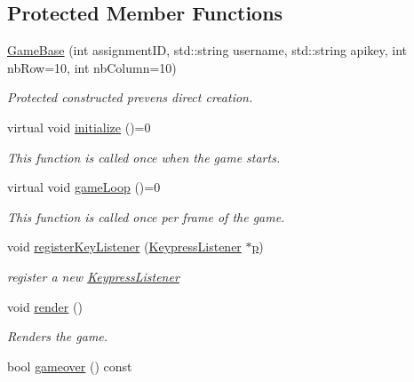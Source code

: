 \subsection*{Protected Member Functions}
\begin{DoxyCompactItemize}
\item 
\hyperlink{classbridges_1_1game_1_1_game_base_abd73825c57a10d28191a3f1162eb9bd8}{Game\+Base} (int assignment\+ID, std\+::string username, std\+::string apikey, int nb\+Row=10, int nb\+Column=10)
\begin{DoxyCompactList}\small\item\em Protected constructed prevens direct creation. \end{DoxyCompactList}\item 
virtual void \hyperlink{classbridges_1_1game_1_1_game_base_a9b6eb6fa7fceaac09d204b549164037f}{initialize} ()=0
\begin{DoxyCompactList}\small\item\em This function is called once when the game starts. \end{DoxyCompactList}\item 
virtual void \hyperlink{classbridges_1_1game_1_1_game_base_a16fb787bc65be1a582cddcfba3a0c5bb}{game\+Loop} ()=0
\begin{DoxyCompactList}\small\item\em This function is called once per frame of the game. \end{DoxyCompactList}\item 
void \hyperlink{classbridges_1_1game_1_1_game_base_a9612e74fe407127cae8455a0e34b5662}{register\+Key\+Listener} (\hyperlink{classbridges_1_1game_1_1_keypress_listener}{Keypress\+Listener} $\ast$\hyperlink{namespacebridges_1_1game_ab9a19c7ab6e2ebac2f95180e21733487a83878c91171338902e0fe0fb97a8c47a}{p})
\begin{DoxyCompactList}\small\item\em register a new \hyperlink{classbridges_1_1game_1_1_keypress_listener}{Keypress\+Listener} \end{DoxyCompactList}\item 
void \hyperlink{classbridges_1_1game_1_1_game_base_ac042479b1d1cf87b8ea7c8884d5326b6}{render} ()
\begin{DoxyCompactList}\small\item\em Renders the game. \end{DoxyCompactList}\item 
bool \hyperlink{classbridges_1_1game_1_1_game_base_adbc9759ea7995f2ee224e9b85d798f2f}{gameover} () const

\end{DoxyCompactItemize}
